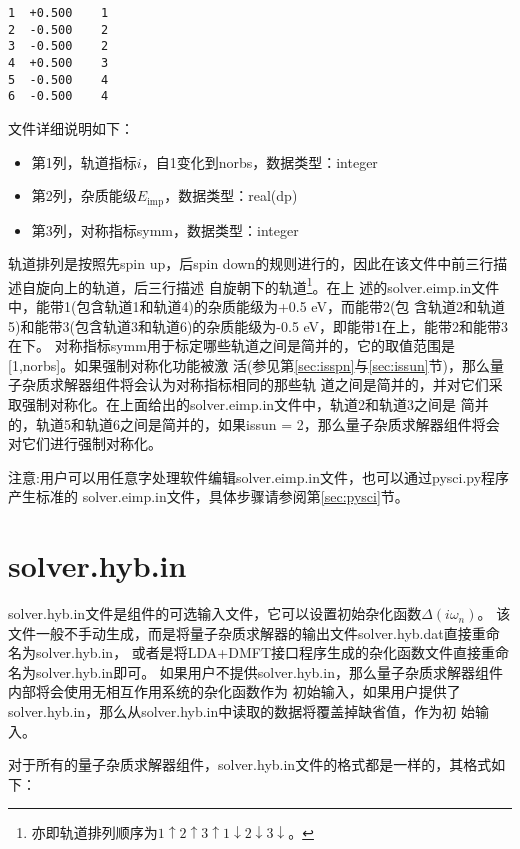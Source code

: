 \begin{lstlisting}[frame=single]
1  +0.500    1
2  -0.500    2
3  -0.500    2
4  +0.500    3
5  -0.500    4
6  -0.500    4
\end{lstlisting}
文件详细说明如下：
\begin{itemize}
  \item 第1列，轨道指标$i$，自1变化到norbs，数据类型：integer
  \item 第2列，杂质能级$E_{\text{imp}}$，数据类型：real(dp)
  \item 第3列，对称指标symm，数据类型：integer
\end{itemize}
轨道排列是按照先spin up，后spin down的规则进行的，因此在该文件中前三行描述自旋向上的轨道，后三行描述
自旋朝下的轨道\footnote{亦即轨道排列顺序为$1\uparrow2\uparrow3\uparrow1\downarrow2\downarrow3\downarrow$。}。在上
述的solver.eimp.in文件中，能带1(包含轨道1和轨道4)的杂质能级为+0.5 eV，而能带2(包
含轨道2和轨道5)和能带3(包含轨道3和轨道6)的杂质能级为-0.5 eV，即能带1在上，能带2和能带3在下。
对称指标symm用于标定哪些轨道之间是简并的，它的取值范围是[1,norbs]。如果强制对称化功能被激
活(参见第\ref{sec:isspn}与\ref{sec:issun}节)，那么量子杂质求解器组件将会认为对称指标相同的那些轨
道之间是简并的，并对它们采取强制对称化。在上面给出的solver.eimp.in文件中，轨道2和轨道3之间是
简并的，轨道5和轨道6之间是简并的，如果issun = 2，那么量子杂质求解器组件将会对它们进行强制对称化。

注意:用户可以用任意字处理软件编辑solver.eimp.in文件，也可以通过pysci.py程序产生标准的
solver.eimp.in文件，具体步骤请参阅第\ref{sec:pysci}节。

\section{solver.hyb.in}
\label{sec:shi}

solver.hyb.in文件是{\iqist}组件的可选输入文件，它可以设置初始杂化函数$\Delta(i\omega_{n})$。
该文件一般不手动生成，而是将量子杂质求解器的输出文件solver.hyb.dat直接重命名为solver.hyb.in，
或者是将LDA+DMFT接口程序生成的杂化函数文件直接重命名为solver.hyb.in即可。
如果用户不提供solver.hyb.in，那么量子杂质求解器组件内部将会使用无相互作用系统的杂化函数作为
初始输入，如果用户提供了solver.hyb.in，那么从solver.hyb.in中读取的数据将覆盖掉缺省值，作为初
始输入。

对于所有的量子杂质求解器组件，solver.hyb.in文件的格式都是一样的，其格式如下：

